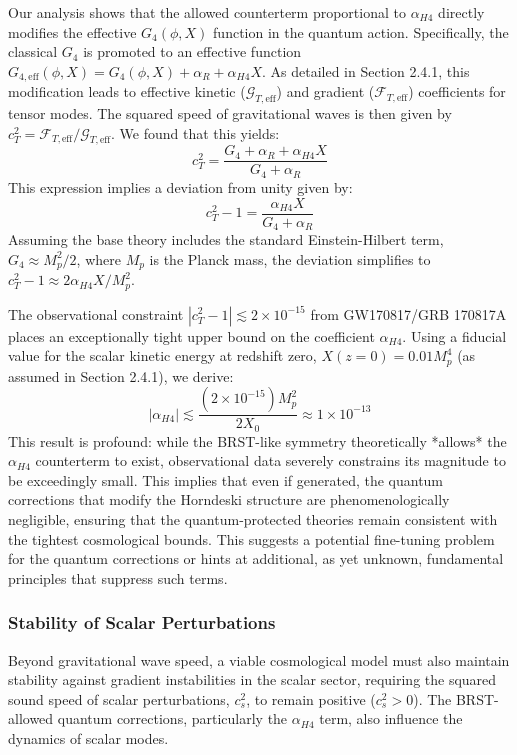 \documentclass[twocolumn]{aastex631}
\begin{document}
Our analysis shows that the allowed counterterm proportional to $\alpha_{H4}$ directly modifies the effective $G_4(\phi, X)$ function in the quantum action. Specifically, the classical $G_4$ is promoted to an effective function $G_{4, \text{eff}}(\phi, X) = G_4(\phi, X) + \alpha_R + \alpha_{H4} X$. As detailed in Section 2.4.1, this modification leads to effective kinetic ($\mathcal{G}_{T, \text{eff}}$) and gradient ($\mathcal{F}_{T, \text{eff}}$) coefficients for tensor modes. The squared speed of gravitational waves is then given by $c_T^2 = \mathcal{F}_{T, \text{eff}} / \mathcal{G}_{T, \text{eff}}$. We found that this yields:
\begin{equation}
c_T^2 = \frac{G_4 + \alpha_R + \alpha_{H4} X}{G_4 + \alpha_R}
\label{eq:ct_squared}
\end{equation}
This expression implies a deviation from unity given by:
\begin{equation}
c_T^2 - 1 = \frac{\alpha_{H4} X}{G_4 + \alpha_R}
\label{eq:ct_deviation}
\end{equation}
Assuming the base theory includes the standard Einstein-Hilbert term, $G_4 \approx M_p^2/2$, where $M_p$ is the Planck mass, the deviation simplifies to $c_T^2 - 1 \approx 2 \alpha_{H4} X / M_p^2$.

The observational constraint $|c_T^2 - 1| \lesssim 2 \times 10^{-15}$ from GW170817/GRB 170817A places an exceptionally tight upper bound on the coefficient $\alpha_{H4}$. Using a fiducial value for the scalar kinetic energy at redshift zero, $X(z=0) = 0.01 M_p^4$ (as assumed in Section 2.4.1), we derive:
\begin{equation}
|\alpha_{H4}| \lesssim \frac{(2 \times 10^{-15}) M_p^2}{2 X_0} \approx 1 \times 10^{-13}
\label{eq:alpha_h4_constraint}
\end{equation}
This result is profound: while the BRST-like symmetry theoretically *allows* the $\alpha_{H4}$ counterterm to exist, observational data severely constrains its magnitude to be exceedingly small. This implies that even if generated, the quantum corrections that modify the Horndeski structure are phenomenologically negligible, ensuring that the quantum-protected theories remain consistent with the tightest cosmological bounds. This suggests a potential fine-tuning problem for the quantum corrections or hints at additional, as yet unknown, fundamental principles that suppress such terms.

\subsubsection{Stability of Scalar Perturbations}
Beyond gravitational wave speed, a viable cosmological model must also maintain stability against gradient instabilities in the scalar sector, requiring the squared sound speed of scalar perturbations, $c_s^2$, to remain positive ($c_s^2 > 0$). The BRST-allowed quantum corrections, particularly the $\alpha_{H4}$ term, also influence the dynamics of scalar modes.
\end{document}
